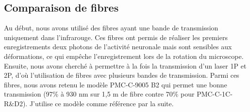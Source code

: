 
\subsection{Comparaison de fibres}



Au début, nous avons utilisé des fibres ayant une bande de transmission uniquement dans l'infrarouge. Ces fibres ont permis de réaliser les premiers enregistrements deux photons de l'activité neuronale mais sont sensibles aux déformations, ce qui empêche l'enregistrement lors de la rotation du microscope. Ensuite, nous avons cherché à permettre à la fois la transmission d'un laser 1P et 2P, d'où l'utilisation de fibres avec plusieurs bandes de transmission. Parmi ces fibres, nous avons retenu le modèle PMC-C-9005 B2 qui permet une bonne transmission (97\% à 930 nm sur 1,5 m de fibre contre 70\% pour PMC-C-1C-R\&D2). J'utilise ce modèle comme référence par la suite.


